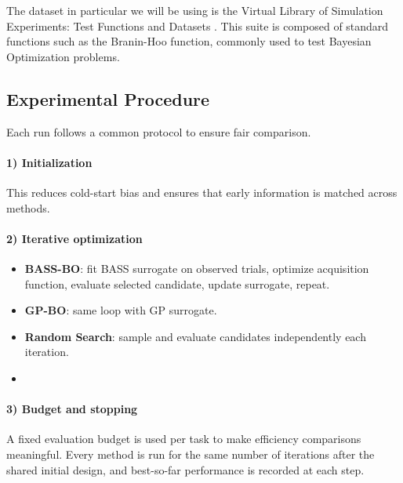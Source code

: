 The dataset in particular we will be using is the Virtual Library of Simulation Experiments: Test Functions and Datasets \cite{simulationlib}. This suite is composed of standard functions such as the Branin-Hoo function, commonly used to test Bayesian Optimization problems.

\subsection{Experimental Procedure}

Each run follows a common protocol to ensure fair comparison.

\paragraph{1) Initialization}
 This reduces cold-start bias and ensures that early information is matched across methods.

\paragraph{2) Iterative optimization}
\begin{itemize}
	\item \textbf{BASS-BO}: fit BASS surrogate on observed trials, optimize acquisition function, evaluate selected candidate, update surrogate, repeat.
	\item \textbf{GP-BO}: same loop with GP surrogate.
	\item \textbf{Random Search}: sample and evaluate candidates independently each iteration.
	\item {}
\end{itemize}

\paragraph{3) Budget and stopping}
A fixed evaluation budget is used per task to make efficiency comparisons meaningful. Every method is run for the same number of iterations after the shared initial design, and best-so-far performance is recorded at each step.

